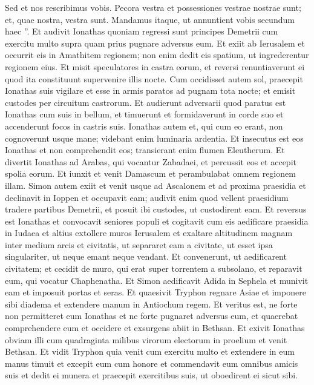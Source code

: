 \begin{biblechapter}
\begin{biblechapter}
\begin{biblechapter}
\begin{biblechapter}
\begin{biblechapter}
\begin{biblechapter}
\begin{biblechapter}
\begin{biblechapter}
\begin{biblechapter}
\begin{biblechapter}
\begin{biblechapter}
\begin{biblechapter}
\verse Sed et nos rescribimus vobis. Pecora vestra et possessiones vestrae nostrae sunt; et, quae nostra, vestra sunt. Mandamus itaque, ut annuntient vobis secundum haec ”.
 \verse Et audivit Ionathas quoniam regressi sunt principes Demetrii cum exercitu multo supra quam prius pugnare adversus eum. 
\verse Et exiit ab Ierusalem et occurrit eis in Amathitem regionem; non enim dedit eis spatium, ut ingrederentur regionem eius. 
\verse Et misit speculatores in castra eorum, et reversi renuntiaverunt ei quod ita constituunt supervenire illis nocte. 
\verse Cum occidisset autem sol, praecepit Ionathas suis vigilare et esse in armis paratos ad pugnam tota nocte; et emisit custodes per circuitum castrorum. 
\verse Et audierunt adversarii quod paratus est Ionathas cum suis in bellum, et timuerunt et formidaverunt in corde suo et accenderunt focos in castris suis. 
\verse Ionathas autem et, qui cum eo erant, non cognoverunt usque mane; videbant enim luminaria ardentia. 
\verse Et insecutus est eos Ionathas et non comprehendit eos; transierant enim flumen Eleutherum. 
\verse Et divertit Ionathas ad Arabas, qui vocantur Zabadaei, et percussit eos et accepit spolia eorum. 
\verse Et iunxit et venit Damascum et perambulabat omnem regionem illam. 
\verse Simon autem exiit et venit usque ad Ascalonem et ad proxima praesidia et declinavit in Ioppen et occupavit eam; 
\verse audivit enim quod vellent praesidium tradere partibus Demetrii, et posuit ibi custodes, ut custodirent eam.
 \verse Et reversus est Ionathas et convocavit seniores populi et cogitavit cum eis aedificare praesidia in Iudaea 
\verse et altius extollere muros Ierusalem et exaltare altitudinem magnam inter medium arcis et civitatis, ut separaret eam a civitate, ut esset ipsa singulariter, ut neque emant neque vendant. 
\verse Et convenerunt, ut aedificarent civitatem; et cecidit de muro, qui erat super torrentem a subsolano, et reparavit eum, qui vocatur Chaphenatha. 
\verse Et Simon aedificavit Adida in Sephela et munivit eam et imposuit portas et seras.
 \verse Et quaesivit Tryphon regnare Asiae et imponere sibi diadema et extendere manum in Antiochum regem. 
\verse Et veritus est, ne forte non permitteret eum Ionathas et ne forte pugnaret adversus eum, et quaerebat comprehendere eum et occidere et exsurgens abiit in Bethsan. 
\verse Et exivit Ionathas obviam illi cum quadraginta milibus virorum electorum in proelium et venit Bethsan. 
\verse Et vidit Tryphon quia venit cum exercitu multo et extendere in eum manus timuit 
 \verse et excepit eum cum honore et commendavit eum omnibus amicis suis et dedit ei munera et praecepit exercitibus suis, ut oboedirent ei sicut sibi. 

\end{biblechapter}
\end{biblechapter}
\end{biblechapter}
\end{biblechapter}
\end{biblechapter}
\end{biblechapter}
\end{biblechapter}
\end{biblechapter}
\end{biblechapter}
\end{biblechapter}
\end{biblechapter}
\end{biblechapter}

